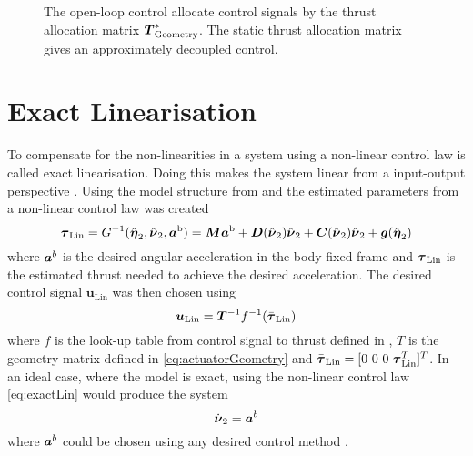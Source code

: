 \begin{figure}
    \centering
    \caption{The open-loop control allocate control signals by the thrust allocation matrix $\thrusterGeometryOnes[*]$. The static thrust allocation matrix gives an approximately decoupled control.}
    \label{fig:open_control}
\end{figure}

\section{Exact Linearisation}
To compensate for the non-linearities in a system using a non-linear control law is called exact linearisation. Doing this makes the system linear from a input-output perspective \citep{reglerteori}. Using the model structure from  and the estimated parameters from  a non-linear control law was created 
\begin{equation}\label{eq:exactLin}
\tauVector_{\text{Lin}} = G^{-1}(\hat{\etaVector}_{2},\hat{\nuVector}_{2},\accVector^{\text{b}}) = \inertia \accVector^{\text{b}} + \damping(\hat{\nuVector}_{2})\hat{\nuVector}_{2} + \coriolis(\hat{\nuVector}_{2})\hat{\nuVector}_{2} + \gravity(\hat{\etaVector}_{2})
\end{equation}
where $\accVector^b$ is the desired angular acceleration in the body-fixed frame and $\tauVector_{\text{Lin}}$ is the estimated thrust needed to achieve the desired acceleration.
The desired control signal $\boldsymbol{u}_{\text{Lin}}$ was then chosen using 
\begin{equation}\label{eq:linControlSignal}
\boldsymbol{u}_{\text{Lin}} = \boldsymbol{T}^{-1}f^{-1}(\bar{\tauVector}_{\text{Lin}})
\end{equation} where $f$ is the look-up table from control signal to thrust defined in , $T$ is the geometry matrix defined in \eqref{eq:actuatorGeometry} and $\bar{\tauVector}_{\text{Lin}}=[0~0~0~\tauVector_{\text{Lin}}^T]^T$.
In an ideal case, where the model is exact, using the non-linear control law \eqref{eq:exactLin} would produce the system
\begin{equation}\label{eq:exactLinSys}
\nuVectorAngdot = \accVector^b
\end{equation} 
where $\accVector^b$ could be chosen using any desired control method \citep[p.451]{fossen2011}.

